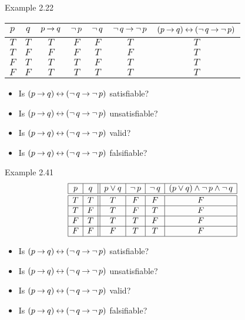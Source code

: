 \documentclass[style=sailor,size=12pt]{powerdot}
\begin{document}
\begin{wideslide}[bm=,toc=]{Example 2.22}
\begin{center}
\begin{tabular}{|c|c||c|c|c|c|c|}
\hline
$p$ & $q$ & $p \imp q$ & $\ngg p$ & $\ngg q$ 
& $\ngg q \imp \ngg p$ & $(p\imp q)\eqv  (\ngg q\imp \ngg p)$\\ \hline \hline
$T$ & $T$ & $T$  & $F$ & $F$  & $T$ & $T$  \\ \hline
$T$ & $F$ & $F$ & $F$ & $T$  & $F$ & $T$   \\ \hline
$F$ & $T$ & $T$ & $T$ & $F$  & $T$ & $T$   \\ \hline
$F$ & $F$ & $T$ & $T$ & $T$  & $T$ & $T$   \\ \hline
\end{tabular}
\end{center}
\begin{itemize}
\item Is $(p\imp q)\eqv  (\ngg q\imp \ngg p)$ satisfiable?
\item Is $(p\imp q)\eqv  (\ngg q\imp \ngg p)$ unsatisfiable?
\item Is $(p\imp q)\eqv  (\ngg q\imp \ngg p)$ valid?
\item Is $(p\imp q)\eqv  (\ngg q\imp \ngg p)$ falsifiable?
\end{itemize}
\end{wideslide}

\begin{wideslide}[bm=,toc=]{Example 2.41}
\begin{displaymath}
\begin{array}{|c|c||c|c|c|c|}
\hline
p & q & p \vee q & \ngg p & \ngg q &
(p \vee q) \wedge \ngg p \wedge \ngg q \\ \hline \hline
T & T & T & F & F & F \\ \hline
T & F & T & F & T & F \\ \hline
F & T & T & T & F & F \\ \hline
F & F & F & T & T & F \\ \hline
\end{array}
\end{displaymath}
\begin{itemize}
\item Is $(p\imp q)\eqv  (\ngg q\imp \ngg p)$ satisfiable?
\item Is $(p\imp q)\eqv  (\ngg q\imp \ngg p)$ unsatisfiable?
\item Is $(p\imp q)\eqv  (\ngg q\imp \ngg p)$ valid?
\item Is $(p\imp q)\eqv  (\ngg q\imp \ngg p)$ falsifiable?
\end{itemize}
\end{wideslide}
\end{document}
